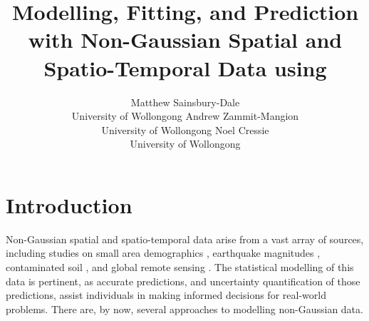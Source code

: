 \documentclass[nojss]{jss}
\author{Matthew Sainsbury-Dale\\University of Wollongong
   \And \quad\quad Andrew Zammit-Mangion\\\quad\quad University of Wollongong 
   \And Noel Cressie\\University of Wollongong}
\title{Modelling, Fitting, and Prediction with Non-Gaussian Spatial and Spatio-Temporal Data using %
\pkg{FRK}}
\newcommand{\red}[1]{\textcolor{red}{#1}}
\begin{document}
\sloppy %





\section{Introduction}\label{sec:intro}

 Non-Gaussian spatial and spatio-temporal data arise from a vast array of sources, including studies on small area demographics \citep{Bradley_2016_Bayesian_spatial_COS_lattice_data}, earthquake magnitudes \citep{Hu_2018_log-gamma_earthquake_magnitudes}, contaminated soil \citep{Paul_Cressie_2011_lognormal_kriging_block_prediction}, and global remote sensing  \citep{Sengupta_2016_MODIS}.  
 The statistical modelling of this data is pertinent, as accurate predictions, and uncertainty quantification of those predictions, assist individuals in making informed decisions for real-world problems. 
 There are, by now, several approaches to modelling non-Gaussian data. 
\end{document}
